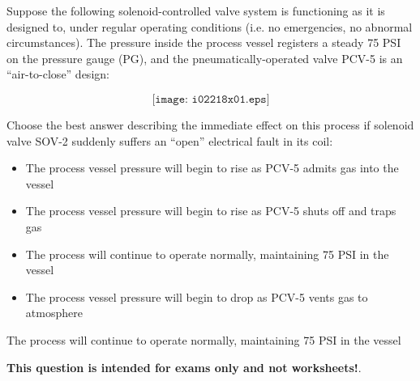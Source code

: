 

Suppose the following solenoid-controlled valve system is functioning as it is designed to, under regular operating conditions (i.e. no emergencies, no abnormal circumstances).  The pressure inside the process vessel registers a steady 75 PSI on the pressure gauge (PG), and the pneumatically-operated valve PCV-5 is an ``air-to-close'' design:

$$\texttt{[image: i02218x01.eps]}$$

\noindent
Choose the best answer describing the immediate effect on this process if solenoid valve SOV-2 suddenly suffers an ``open'' electrical fault in its coil:

\begin{itemize}
\item{} The process vessel pressure will begin to rise as PCV-5 admits gas into the vessel
\vskip 10pt
\item{} The process vessel pressure will begin to rise as PCV-5 shuts off and traps gas
\vskip 10pt
\item{} The process will continue to operate normally, maintaining 75 PSI in the vessel
\vskip 10pt
\item{} The process vessel pressure will begin to drop as PCV-5 vents gas to atmosphere
\end{itemize}







The process will continue to operate normally, maintaining 75 PSI in the vessel







{\bf This question is intended for exams only and not worksheets!}.



